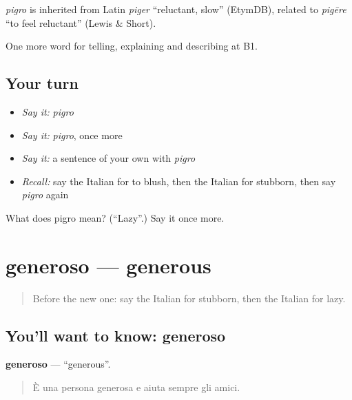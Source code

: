\begin{cousinweb}
\emph{pigro} is inherited from Latin \emph{piger} \textquotedblleft{}reluctant, slow\textquotedblright{} (EtymDB), related to \emph{pigēre} \textquotedblleft{}to feel reluctant\textquotedblright{} (Lewis \& Short).
\end{cousinweb}

\begin{grammarlens}[title={What you've built}]
One more word for telling, explaining and describing at B1.
\end{grammarlens}

\subsection*{Your turn}
\begin{itemize}
\raggedright
  \item \emph{Say it:} \emph{pigro}
  \item \emph{Say it:} \emph{pigro}, once more
  \item \emph{Say it:} a sentence of your own with \emph{pigro}
  \item \emph{Recall:} say the Italian for to blush, then the Italian for stubborn, then say \emph{pigro} again
\end{itemize}

\begin{tcolorbox}[breakable,colback=teal!4,colframe=teal!35!black,title={Before you move on}]
What does pigro mean? (\textquotedblleft{}Lazy\textquotedblright{}.) Say it once more.
\end{tcolorbox}
\section[generoso]{generoso — generous}

\label{lesson:IT-C472-generoso}



\begin{quote}
Before the new one: say the Italian for stubborn, then the Italian for lazy.
\end{quote}

\subsection*{You'll want to know: generoso}
\textbf{generoso} — \textquotedblleft{}generous\textquotedblright{}.

\begin{quote}
È una persona generosa e aiuta sempre gli amici.
\end{quote}

